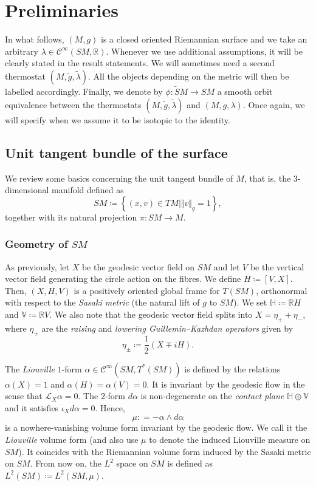 \documentclass[reqno,12pt,letterpaper]{amsart}
\theoremstyle{definition}
\theoremstyle{remark}
\theoremstyle{definition}
\numberwithin{equation}{section}
\newcommand{\R}{\mathbb{R}}
\begin{document}
\section{Preliminaries}\label{section:preliminaries}
In what follows, $(M,g)$ is a closed oriented Riemannian surface and we take an arbitrary $\lambda\in \mathcal{C}^\infty(SM, \R)$. Whenever we use additional assumptions, it will be clearly stated in the result statements. We will sometimes need a second thermostat $(M, \tilde{g}, \tilde{\lambda})$. All the objects depending on the metric will then be labelled accordingly. Finally, we denote by $\phi : \widetilde{S}M\to SM$ a smooth orbit equivalence between the thermostats $(M, \tilde{g}, \tilde{\lambda})$ and $(M, g, \lambda)$. Once again, we will specify when we assume it to be isotopic to the identity.

\subsection{Unit tangent bundle of the surface}\label{subsection:geometry-of-sm}
We review some basics concerning the unit tangent bundle of $M$, that is, the $3$-dimensional manifold defined as
$$SM\coloneqq\left\{(x,v)\in TM\mid \Vert v\Vert_g = 1\right\},$$
together with its natural projection $\pi: SM\to M$.
\subsubsection{Geometry of $SM$}
As previously, let $X$ be the geodesic vector field on $SM$ and let $V$ be the vertical vector field generating the circle action on the fibres. We define $H\coloneqq[V,X]$. Then, $(X, H, V)$ is a positively oriented global frame for $T(SM)$, orthonormal with respect to the \textit{Sasaki metric} (the natural lift of $g$ to $SM$). We set $\mathbb{H}\coloneqq\R H$ and $\mathbb{V}\coloneqq\R V$. We also note that the geodesic vector field splits into $X=\eta_+ +\eta_-$, where $\eta_\pm$ are the \textit{raising} and \textit{lowering Guillemin--Kazhdan operators} given by
\begin{equation}\label{eq:ladder-operators}
\eta_\pm \coloneqq \dfrac{1}{2}(X\mp i H).
\end{equation}

The \textit{Liouville} $1$-form $\alpha\in \mathcal{C}^\infty(SM, T^*(SM))$ is defined by the relations $\alpha(X)=1$ and $\alpha(H)=\alpha(V)=0$. It is invariant by the geodesic flow in the sense that $\mathcal{L}_X \alpha=0$. The $2$-form $d\alpha$ is non-degenerate on the \textit{contact plane} $\mathbb{H}\oplus \mathbb{V}$ and it satisfies $\iota_X d\alpha=0$. Hence,
$$\mu: = -\alpha\wedge d\alpha$$
is a nowhere-vanishing volume form invariant by the geodesic flow. We call it the \textit{Liouville} volume form (and also use $\mu$ to denote the induced Liouville measure on $SM$). It coincides with the Riemannian volume form induced by the Sasaki metric on $SM$. From now on, the $L^2$ space on $SM$ is defined as $L^2(SM)\coloneqq L^2(SM, \mu)$. 
\end{document}
